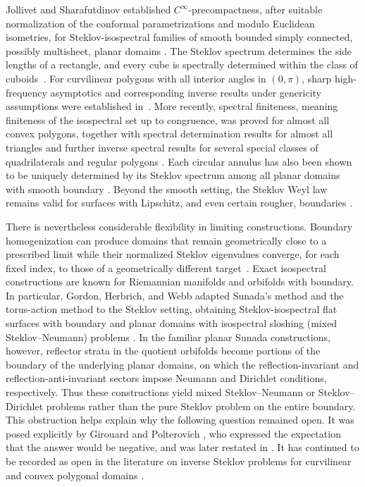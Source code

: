 \documentclass[11pt,letterpaper,reqno]{amsart}
\theoremstyle{definition}
\begin{document}
Jollivet and Sharafutdinov established $C^\infty$-precompactness, after suitable normalization of the conformal parametrizations and modulo Euclidean isometries, for Steklov-isospectral families of smooth bounded simply connected, possibly multisheet, planar domains \cite{JollivetSharafutdinov2018}. The Steklov spectrum determines the side lengths of a rectangle, and every cube is spectrally determined within the class of cuboids~\cite{GirouardLagacePolterovichSavo2019}. For curvilinear polygons with all interior angles in $(0,\pi)$, sharp high-frequency asymptotics and corresponding inverse results under genericity assumptions were established in~\cite{KrymskiLevitinParnovskiPolterovichSher2021,LevitinParnovskiPolterovichSher2022}. More recently, spectral finiteness, meaning finiteness of the isospectral
set up to congruence, was proved for almost all convex polygons, together with spectral determination results for almost all triangles and further inverse spectral results for several special classes of quadrilaterals and regular polygons
\cite{DrydenGordonMorenoRowlettVillegas2025,
DrydenGordonMorenoRowlettVillegas2026}. Each circular annulus has
also been shown to be uniquely determined by its Steklov spectrum
among all planar domains with smooth boundary \cite{JinWang2026}.
Beyond the smooth setting, the Steklov Weyl law remains valid for
surfaces with Lipschitz, and even certain rougher, boundaries
\cite{KarpukhinLagacePolterovich2023}.

There is nevertheless considerable flexibility in limiting constructions. Boundary homogenization can produce domains that remain geometrically close to a prescribed limit while their normalized Steklov eigenvalues converge, for each fixed index, to those of a geometrically different target~\cite{BucurNahon2021,KarpukhinLagace2024}. Exact isospectral constructions are known for Riemannian manifolds and orbifolds with boundary. In particular, Gordon, Herbrich, and Webb adapted Sunada's method \cite{Sunada1985} and the torus-action method to the Steklov setting, obtaining Steklov-isospectral flat surfaces with boundary and planar domains with isospectral sloshing (mixed Steklov--Neumann) problems \cite{GordonHerbrichWebb2021}. In the familiar planar Sunada constructions, however, reflector strata in the quotient orbifolds become portions of the boundary of the underlying planar domains, on which the reflection-invariant and reflection-anti-invariant sectors impose Neumann and Dirichlet conditions, respectively. Thus these constructions yield mixed Steklov--Neumann or Steklov--Dirichlet problems rather than the pure Steklov problem on the entire boundary. This obstruction helps explain why the following question remained open. It was posed explicitly by Girouard and Polterovich \cite[Open Problem~6]{GirouardPolterovich2017}, who expressed the expectation that the answer would be negative, and was later restated in \cite[Open Question~9.11]{ColboisGirouardGordonSher2024}. It has continued to be recorded as open in the literature on inverse Steklov problems for curvilinear and convex polygonal domains \cite{DrydenGordonMorenoRowlettVillegas2025,DrydenGordonMorenoRowlettVillegas2026,KrymskiLevitinParnovskiPolterovichSher2021}.
\end{document}

